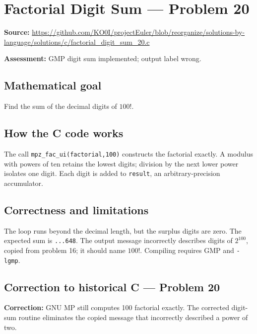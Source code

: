 \section{Factorial Digit Sum --- Problem 20}
\label{prob:20}
\noindent\textbf{Source:} \url{https://github.com/KO0I/projectEuler/blob/reorganize/solutions-by-language/solutions/c/factorial_digit_sum_20.c}

\noindent\textbf{Assessment:} GMP digit sum implemented; output label wrong.

\subsection*{Mathematical goal}
Find the sum of the decimal digits of \(100!\).

\subsection*{How the C code works}
The call \verb|mpz_fac_ui(factorial,100)| constructs the factorial exactly. A modulus with powers of ten retains the lowest digits; division by the next lower power isolates one digit. Each digit is added to \verb|result|, an arbitrary-precision accumulator.

\subsection*{Correctness and limitations}
The loop runs beyond the decimal length, but the surplus digits are zero. The expected sum is \texttt{...648}. The output message incorrectly describes digits of \(2^{100}\), copied from problem 16; it should name \(100!\). Compiling requires GMP and \verb|-lgmp|.


\subsection*{Correction to historical C --- Problem 20}
{\color{red}\textbf{Correction:} GNU MP still computes 100 factorial exactly. The corrected digit-sum routine eliminates the copied message that incorrectly described a power of two.}
